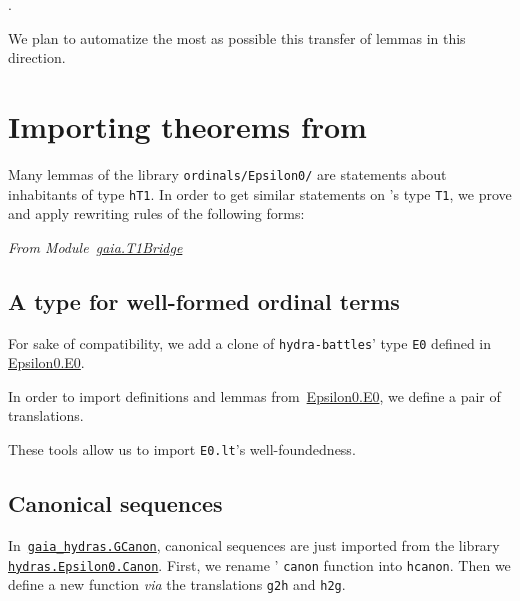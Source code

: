  .

We plan to automatize the most as possible this transfer of lemmas in this direction.
 
\section{Importing theorems from \HydrasLib}


Many lemmas of the library \texttt{ordinals/Epsilon0/} are statements about inhabitants of type \texttt{hT1}. In order to get
similar statements on \gaia's type \texttt{T1}, we prove and
apply rewriting rules of the following forms:

\vspace{4pt}

\noindent\emph{From Module~\href{../theories/html/gaia.T1Bridge.html}{gaia.T1Bridge}}





\subsection{A type for well-formed ordinal terms}

For sake of compatibility, we add a clone of \texttt{hydra-battles}' type \texttt{E0} defined in \href{../theories/html/hydras.Epsilon0.E0.html}{Epsilon0.E0}.


In order to import definitions and lemmas
from~\href{../theories/html/hydras.Epsilon0.E0.html}{Epsilon0.E0}, we define a pair of translations.


These tools allow us to import \texttt{E0.lt}'s  well-foundedness.



\subsection{Canonical sequences}


In~\href{../theories/html/gaia_hydras.GCanon.html}%
{\texttt{gaia\_hydras.GCanon}}, canonical sequences are just imported from the library \linebreak
\href{../theories/html/hydras.Epsilon0.Canon.html}%
{\texttt{hydras.Epsilon0.Canon}}.
First, we rename \HydrasLib' \texttt{canon} function into
\texttt{hcanon}. Then we define a new function \emph{via} the
translations \texttt{g2h} and \texttt{h2g}.

